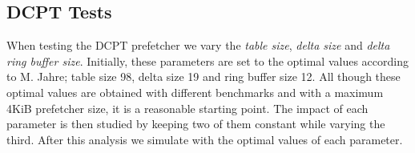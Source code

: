 \subsection{DCPT Tests}
When testing the DCPT prefetcher we
vary the \emph{table size}, \emph{delta size} and \emph{delta ring buffer size}. 
Initially, these parameters are set to the optimal values according to 
M. Jahre\cite{DCPT}; table size 98, delta size 19 and ring buffer size 12.
All though these optimal values are obtained with different benchmarks and with a maximum 
4KiB prefetcher size, it is a reasonable starting point. The impact of each parameter is 
then studied by keeping two of them constant while varying the third. After this analysis
we simulate with the optimal values of each parameter. 

